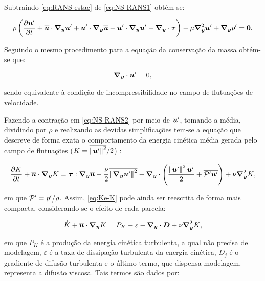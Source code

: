 Subtraindo \eqref{eq:RANS-estac} de \eqref{eq:NS-RANS1} obtém-se:

\begin{equation}
    \rho\left({\frac{\partial{\boldsymbol{u}'}}{\partial t}+\overline{\boldsymbol{u}}\cdot\boldsymbol{\nabla_y}\boldsymbol{u}'+\boldsymbol{u}'\cdot\boldsymbol{\nabla_y}\overline{\boldsymbol{u}}+\boldsymbol{u}'\cdot\boldsymbol{\nabla_y}\boldsymbol{u}'-\boldsymbol{\nabla_y}\cdot\boldsymbol{\tau}}\right)-\mu\boldsymbol{\nabla}^2_{\boldsymbol{y}}\boldsymbol{u}'+\boldsymbol{\nabla_y} p'=\boldsymbol{0}\text{.}
    \label{eq:NS-RANS2}
\end{equation}

Seguindo o mesmo procedimento para a equação da conservação da massa obtém-se que:

\begin{equation}
    \boldsymbol{\nabla_y}\cdot\boldsymbol{u}'=0\text{,}
\end{equation}

\noindent sendo equivalente à condição de incompressibilidade no campo de flutuações de velocidade.

Fazendo a contração em \eqref{eq:NS-RANS2} por meio de $\boldsymbol{u}'$, tomando a média, dividindo por $\rho$ e realizando as devidas simplificações tem-se a equação que descreve de forma exata o comportamento da energia cinética média gerada pelo campo de flutuações ($K=\overline{\left\lVert{\boldsymbol{u}'}\right\lVert^2}/2$) \cite{alfonsi2009reynolds}:


\begin{equation}
    \frac{\partial{K}}{\partial t}+\overline{\boldsymbol{u}}\cdot\boldsymbol{\nabla_y} K=\boldsymbol{\tau}:\boldsymbol{\nabla_y}\overline{\boldsymbol{u}}-\frac{\nu}{2}\overline{\left\lVert{\boldsymbol{\nabla_y}\boldsymbol{u}'}\right\lVert^2}-\boldsymbol{\nabla_y}\cdot\left({\frac{\overline{\left\lVert{\boldsymbol{u}'}\right\lVert^2\boldsymbol{u}'}}{2}+\overline{\mathcal{P}'\boldsymbol{u}'}}\right)+\nu\boldsymbol{\nabla}^2_{\boldsymbol{y}} K\text{,}
    \label{eq:Ke-K}
\end{equation}

\noindent em que $\mathcal{P}'=p'/\rho$. Assim, \eqref{eq:Ke-K} pode ainda ser reescrita de forma mais compacta, considerando-se o efeito de cada parcela:

\begin{equation}
    \dot{K}+\overline{\boldsymbol{u}}\cdot\boldsymbol{\nabla_y} K=P_K-\varepsilon-\boldsymbol{\nabla_y}\cdot\boldsymbol{D}+\nu\boldsymbol{\nabla}^2_{\boldsymbol{y}} K\text{,}
\end{equation}

\noindent em que $P_K$ é a produção da energia cinética turbulenta, a qual não precisa de modelagem, $\varepsilon$ é a taxa de dissipação turbulenta da energia cinética, $D_j$ é o gradiente de difusão turbulenta e o último termo, que dispensa modelagem, representa a difusão viscosa. Tais termos são dados por:

